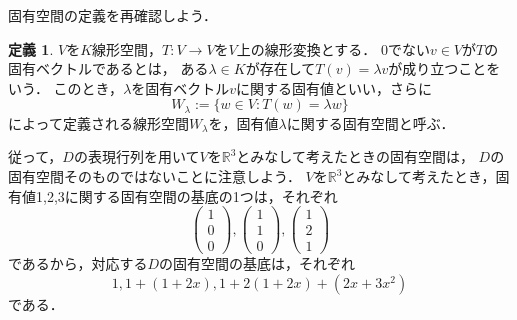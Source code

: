 \documentclass{jsarticle}
\theoremstyle{definition}
\newtheorem{defi}{定義}[section]
\begin{document}
固有空間の定義を再確認しよう．

\begin{boxnote}\begin{defi}
$V$を$K$線形空間，$T: V\to V$を$V$上の線形変換とする．
0でない$v\in V$が$T$の固有ベクトルであるとは，
ある$\lambda\in K$が存在して$T(v)=\lambda v$が成り立つことをいう．
このとき，$\lambda$を固有ベクトル$v$に関する固有値といい，さらに
\[ W_\lambda:=\{w\in V:T(w)=\lambda w\} \]
によって定義される線形空間$W_\lambda$を，固有値$\lambda$に関する固有空間と呼ぶ．
\end{defi}\end{boxnote}

従って，$D$の表現行列を用いて$V$を$\mathbb{R}^3$とみなして考えたときの固有空間は，
$D$の固有空間そのものではないことに注意しよう．
$V$を$\mathbb{R}^3$とみなして考えたとき，固有値1,2,3に関する固有空間の基底の1つは，それぞれ
\[ \begin{pmatrix}1\\0\\0\end{pmatrix},\begin{pmatrix}1\\1\\0\end{pmatrix},
\begin{pmatrix}1\\2\\1\end{pmatrix} \]
であるから，対応する$D$の固有空間の基底は，それぞれ
\[ 1,1+(1+2x),1+2(1+2x)+(2x+3x^2) \]
である．
\end{document}
